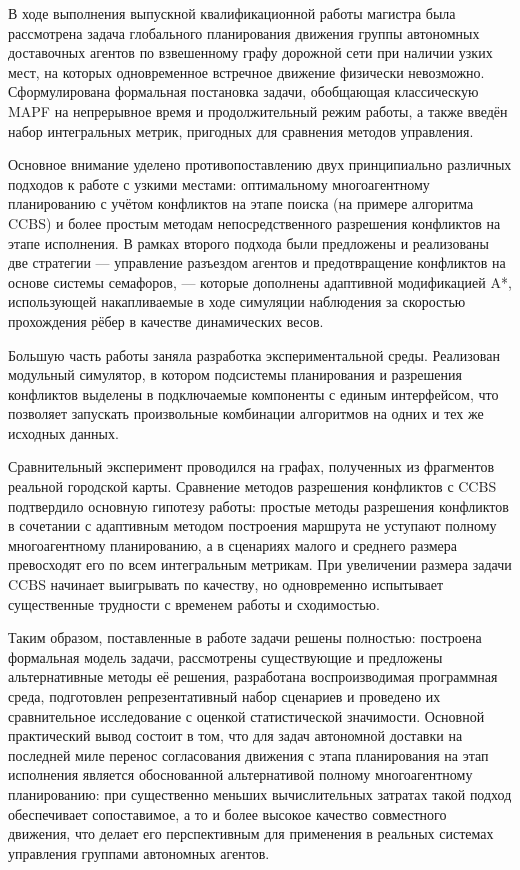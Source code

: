 \conclusion

В ходе выполнения выпускной квалификационной работы магистра была рассмотрена задача глобального 
планирования движения группы автономных доставочных агентов по взвешенному графу дорожной сети при 
наличии узких мест, на которых одновременное встречное движение физически невозможно. Сформулирована 
формальная постановка задачи, обобщающая классическую MAPF на непрерывное время и продолжительный режим 
работы, а также введён набор интегральных метрик, пригодных для сравнения методов управления.

Основное внимание уделено противопоставлению двух принципиально различных подходов к работе с 
узкими местами: оптимальному многоагентному планированию с учётом конфликтов на этапе поиска 
(на примере алгоритма CCBS) и более простым методам непосредственного разрешения конфликтов на 
этапе исполнения. В рамках второго подхода были предложены и реализованы две стратегии --- 
управление разъездом агентов и предотвращение конфликтов на основе системы семафоров, --- 
которые дополнены адаптивной модификацией A*, использующей накапливаемые в ходе симуляции 
наблюдения за скоростью прохождения рёбер в качестве динамических весов.

Большую часть работы заняла разработка экспериментальной среды. Реализован модульный симулятор, 
в котором подсистемы планирования и разрешения конфликтов выделены в подключаемые компоненты 
с единым интерфейсом, что позволяет запускать произвольные комбинации алгоритмов на одних и тех же исходных данных.

Сравнительный эксперимент проводился на графах, полученных из фрагментов реальной городской карты. 
Сравнение методов разрешения конфликтов с CCBS подтвердило основную гипотезу работы: простые методы 
разрешения конфликтов в сочетании с адаптивным методом построения маршрута не уступают полному 
многоагентному планированию, а в сценариях малого и среднего размера превосходят его по всем 
интегральным метрикам. При увеличении размера задачи CCBS начинает выигрывать по качеству, 
но одновременно испытывает существенные трудности с временем работы и сходимостью.

Таким образом, поставленные в работе задачи решены полностью: построена формальная модель задачи, 
рассмотрены существующие и предложены альтернативные методы её решения, разработана воспроизводимая 
программная среда, подготовлен репрезентативный набор сценариев и проведено их сравнительное 
исследование с оценкой статистической значимости. Основной практический вывод состоит в том, 
что для задач автономной доставки на последней миле перенос согласования движения с этапа планирования 
на этап исполнения является обоснованной альтернативой полному многоагентному планированию: 
при существенно меньших вычислительных затратах такой подход обеспечивает сопоставимое, 
а то и более высокое качество совместного движения, что делает его перспективным для применения 
в реальных системах управления группами автономных агентов.

